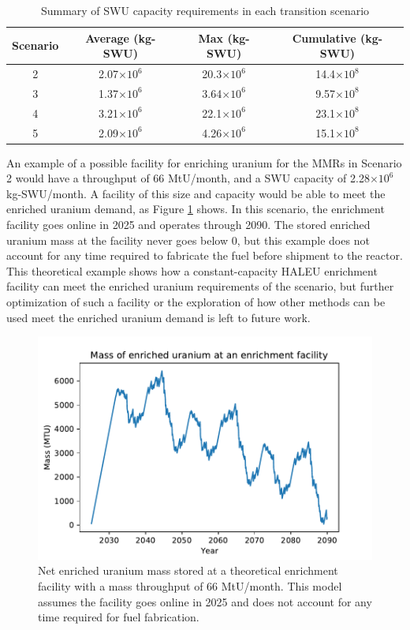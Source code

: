 \begin{table}
    \centering
    \caption{Summary of \gls{SWU} capacity requirements in each transition scenario}
    \label{tab:SWU_summary}
    \begin{tabular}{c c c c}
        \hline
        Scenario & Average (kg-SWU) & Max (kg-SWU) & Cumulative  (kg-SWU) \\\hline
        2 & 2.07$\times 10^6$ & 20.3$\times 10^6$ & 14.4$\times 10^8$ \\
        3 & 1.37$\times 10^6$ & 3.64$\times 10^6$ & 9.57$\times 10^8$ \\
        4 & 3.21$\times 10^6$ & 22.1$\times 10^6$ & 23.1$\times 10^8$ \\
        5 & 2.09$\times 10^6$ & 4.26$\times 10^6$ & 15.1$\times 10^8$
        \\\hline       
    \end{tabular}
\end{table}

An example of a possible facility for enriching uranium for the \glspl{MMR} in 
Scenario 2 would 
have a throughput of 66 MtU/month, and a \gls{SWU} capacity of 2.28$\times 10^6$
kg-SWU/month. A facility of this size and capacity would be able to meet the 
enriched uranium demand, as Figure \ref{fig:enrich_storage}
shows. In this scenario, the enrichment facility goes online in 2025 and operates 
through 2090. The stored enriched uranium mass at the facility never goes below 0, 
but this example does not 
account for any time required to fabricate the fuel before shipment to the reactor.
This theoretical example shows how a constant-capacity \gls{HALEU} enrichment 
facility can meet the enriched uranium requirements of the scenario, but further 
optimization of such a facility or the exploration of how other methods can be
used meet the enriched uranium demand is left to future work. 

\begin{figure}
    \centering
    \includegraphics[width=\textwidth]{../figures/potential_uranium_stockpile.pdf}
    \caption{Net enriched uranium mass stored at a theoretical enrichment facility with 
    a mass throughput of 66 MtU/month. This model assumes the facility goes online in 2025
    and does not account for any time required for fuel fabrication.}
    \label{fig:enrich_storage}
\end{figure}
